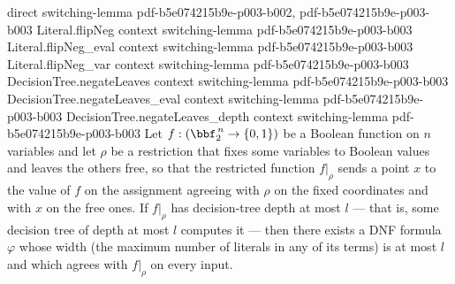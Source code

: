 \begin{theorem}
  {direct}
  {switching-lemma}
  {pdf-b5e074215b9e-p003-b002,
    pdf-b5e074215b9e-p003-b003}
\proofstep
  {Literal.flipNeg}
  {context}
  {switching-lemma}
  {pdf-b5e074215b9e-p003-b003}
\proofstep
  {Literal.flipNeg_eval}
  {context}
  {switching-lemma}
  {pdf-b5e074215b9e-p003-b003}
\proofstep
  {Literal.flipNeg_var}
  {context}
  {switching-lemma}
  {pdf-b5e074215b9e-p003-b003}
\proofstep
  {DecisionTree.negateLeaves}
  {context}
  {switching-lemma}
  {pdf-b5e074215b9e-p003-b003}
\proofstep
  {DecisionTree.negateLeaves_eval}
  {context}
  {switching-lemma}
  {pdf-b5e074215b9e-p003-b003}
\proofstep
  {DecisionTree.negateLeaves_depth}
  {context}
  {switching-lemma}
  {pdf-b5e074215b9e-p003-b003}
Let $f : (\bbf_2^{\,n} \to \{0,1\})$ be a Boolean function on $n$ variables and let
$\rho$ be a restriction that fixes some variables to Boolean values and leaves the
others free, so that the restricted function $f|_\rho$ sends a point $x$ to the value of
$f$ on the assignment agreeing with $\rho$ on the fixed coordinates and with $x$ on the
free ones. If $f|_\rho$ has decision-tree depth at most $l$ — that is, some decision
tree of depth at most $l$ computes it — then there exists a DNF formula $\varphi$ whose
width (the maximum number of literals in any of its terms) is at most $l$ and which
agrees with $f|_\rho$ on every input.
\end{theorem}

